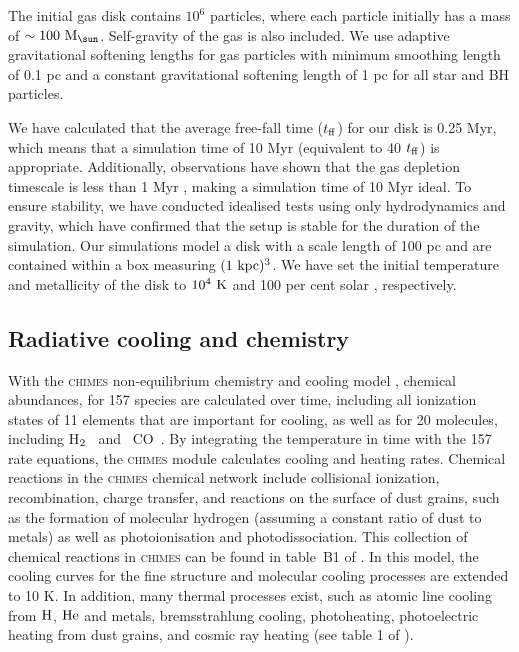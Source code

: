 \documentclass[fleqn,usenatbib]{mnras}
\newcommand{\msun}{\rm M_{\sun}}
\newcommand{\K}{\rm K}
\newcommand{\HH}{\mbox{H$\rm _2$}}
\newcommand{\CO}{\mbox{ CO }}
\begin{document}
 The initial gas disk contains $10^6$ particles, where each particle initially has a mass of  $\sim100\ \msun$.
 Self-gravity of the gas is also included. We use adaptive gravitational softening lengths for gas particles with minimum smoothing length of 0.1 pc and a constant gravitational softening length of 1 pc for all star and BH particles.

We have calculated that the average free-fall time ($t_{\rm ff}$) for our disk is 0.25 Myr, which means that a simulation time of 10 Myr (equivalent to 40 $t_{\rm ff}$) is appropriate. Additionally, observations have shown that the gas depletion timescale is less than 1 Myr \citep{Garcia-Burillo2014}, making a simulation time of 10 Myr ideal. To ensure stability, we have conducted idealised tests using only hydrodynamics and gravity, which have confirmed that the setup is stable for the duration of the simulation. Our simulations model a disk with a scale length of 100 pc and are contained within a box measuring $(1~\rm kpc)^3$. We have set the initial temperature and metallicity of the disk to $10^4~\rm K$ and 100 per cent solar \citep[$Z_{\odot}=0.0196$][]{vonSteiger2016}, respectively.
 

\subsection{Radiative cooling and chemistry}\label{sec:cooling}

With the \textsc{chimes} non-equilibrium chemistry and cooling model \citep{Richings2014a,Richings2014b}, chemical abundances, for 157 species  are calculated over time,  including all ionization states of 11 elements that are important for cooling, as well as for 20 molecules, including  \HH~ and \CO. By integrating the temperature in time with the 157 rate equations, the \textsc{chimes} module calculates cooling and heating rates. Chemical reactions in the \textsc{chimes} chemical network include collisional ionization, recombination, charge transfer, and reactions on the surface of dust grains, such as the formation of molecular hydrogen (assuming a constant ratio of dust to metals) as well as  photoionisation and photodissociation. This collection of chemical reactions in \textsc{chimes} can be found in table~B1 of \citet{Richings2014a}. In this model, the cooling curves for the fine structure and molecular cooling processes are extended to 10 \K.
In addition, many thermal processes exist, such as atomic line cooling from $\rm H$, $\rm He$ and metals, 
bremsstrahlung cooling, photoheating, photoelectric heating from dust grains, and cosmic ray heating (see table 1 of \citealt{Richings2014a}). 
\end{document}
